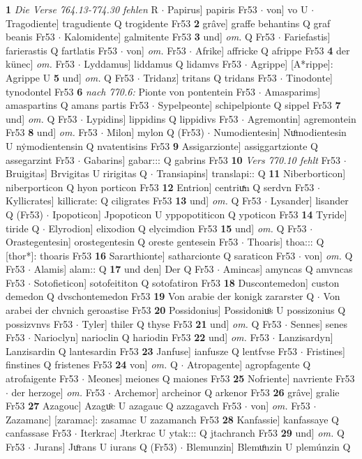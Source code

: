 \documentclass[8pt,a4paper,notitlepage]{article}
\begin{document}
\begin{table}[ht]
\begin{minipage}[t]{0.5\linewidth}
\textbf{1} \textit{Die Verse 764.13-774.30 fehlen} R   $\cdot$ Papirus] papiris Fr53  $\cdot$ von] vo U  $\cdot$ Tragodiente] tragudiente Q trogidente Fr53 \textbf{2} grâve] graffe behantins Q graf beanis Fr53  $\cdot$ Kalomidente] galmitente Fr53 \textbf{3} und] \textit{om.} Q Fr53  $\cdot$ Fariefastis] farierastis Q fartlatis Fr53  $\cdot$ von] \textit{om.} Fr53  $\cdot$ Afrike] affricke Q afrippe Fr53 \textbf{4} der künec] \textit{om.} Fr53  $\cdot$ Lyddamus] liddamus Q lidamvs Fr53  $\cdot$ Agrippe] [A*rippe]: Agrippe U \textbf{5} und] \textit{om.} Q Fr53  $\cdot$ Tridanz] tritans Q tridans Fr53  $\cdot$ Tinodonte] tynodontel Fr53 \textbf{6} \textit{nach 770.6:} Pionte von pontentein Fr53   $\cdot$ Amasparims] amaspartins Q amans partis Fr53  $\cdot$ Sypelpeonte] schipelpionte Q sippel Fr53 \textbf{7} und] \textit{om.} Q Fr53  $\cdot$ Lypidins] lippidins Q lippidivs Fr53  $\cdot$ Agremontin] agremontein Fr53 \textbf{8} und] \textit{om.} Fr53  $\cdot$ Milon] mylon Q (Fr53)  $\cdot$ Numodientesin] Nuͦmodientesin U nẏmodientensin Q nvatentisins Fr53 \textbf{9} Assigarzionte] assiggartzionte Q assegarzint Fr53  $\cdot$ Gabarins] gabar::: Q gabrins Fr53 \textbf{10} \textit{Vers 770.10 fehlt} Fr53   $\cdot$ Bruigitas] Brvigitas U ririgitas Q  $\cdot$ Transiapins] translapi:: Q \textbf{11} Niberborticon] niberporticon Q hyon porticon Fr53 \textbf{12} Entrion] centriuͯn Q serdvn Fr53  $\cdot$ Kyllicrates] killicrate: Q ciligrates Fr53 \textbf{13} und] \textit{om.} Q Fr53  $\cdot$ Lysander] lisander Q (Fr53)  $\cdot$ Ipopoticon] Jpopoticon U yppopotiticon Q ypoticon Fr53 \textbf{14} Tyride] tiride Q  $\cdot$ Elyrodion] elixodion Q elycimdion Fr53 \textbf{15} und] \textit{om.} Q Fr53  $\cdot$ Orastegentesin] orostegentesin Q oreste gentesein Fr53  $\cdot$ Thoaris] thoa::: Q [thor*]: thoaris Fr53 \textbf{16} Sararthionte] satharcionte Q saraticon Fr53  $\cdot$ von] \textit{om.} Q Fr53  $\cdot$ Alamis] alam:: Q \textbf{17} und den] Der Q Fr53  $\cdot$ Amincas] amyncas Q amvncas Fr53  $\cdot$ Sotofieticon] sotofeititon Q sotofatiron Fr53 \textbf{18} Duscontemedon] custon demedon Q dvschontemedon Fr53 \textbf{19} Von arabie der konigk zararster Q  $\cdot$ Von arabei der chvnich geroastise Fr53 \textbf{20} Possidonius] Possidoniuͦs U possizonius Q possizvnvs Fr53  $\cdot$ Tyler] thiler Q thyse Fr53 \textbf{21} und] \textit{om.} Q Fr53  $\cdot$ Sennes] senes Fr53  $\cdot$ Narioclyn] narioclin Q hariodin Fr53 \textbf{22} und] \textit{om.} Fr53  $\cdot$ Lanzisardyn] Lanzisardin Q lantesardin Fr53 \textbf{23} Janfuse] ianfusze Q lentfvse Fr53  $\cdot$ Fristines] finstines Q fristenes Fr53 \textbf{24} von] \textit{om.} Q  $\cdot$ Atropagente] agropfagente Q atrofaigente Fr53  $\cdot$ Meones] meiones Q maiones Fr53 \textbf{25} Nofriente] navriente Fr53  $\cdot$ der herzoge] \textit{om.} Fr53  $\cdot$ Archemor] archeinor Q arkenor Fr53 \textbf{26} grâve] gralie Fr53 \textbf{27} Azagouc] Azaguͦc U azagauc Q azzagavch Fr53  $\cdot$ von] \textit{om.} Fr53  $\cdot$ Zazamanc] [zaramac]: zasamac U zazamanch Fr53 \textbf{28} Kanfassie] kanfassaye Q canfassase Fr53  $\cdot$ Iterkrac] Jterkrac U ytak::: Q jtachranch Fr53 \textbf{29} und] \textit{om.} Q Fr53  $\cdot$ Jurans] Juͦrans U iurans Q (Fr53)  $\cdot$ Blemunzin] Blemuͦnzin U plemúnzin Q 
\end{minipage}
\end{table}
\end{document}
